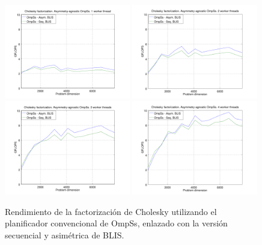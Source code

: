 \begin{figure}%
\centering
\includegraphics[width=0.49\textwidth]{Plots/Orig_runtime/plot_1_th}
\includegraphics[width=0.49\textwidth]{Plots/Orig_runtime/plot_2_th}
\includegraphics[width=0.49\textwidth]{Plots/Orig_runtime/plot_3_th}
\includegraphics[width=0.49\textwidth]{Plots/Orig_runtime/plot_4_th}
\caption{Rendimiento de la factorización de Cholesky utilizando el planificador convencional de OmpSs, enlazado
         con la versión secuencial y asimétrica de BLIS.}
\label{fig:ompss_blis}
\end{figure}


